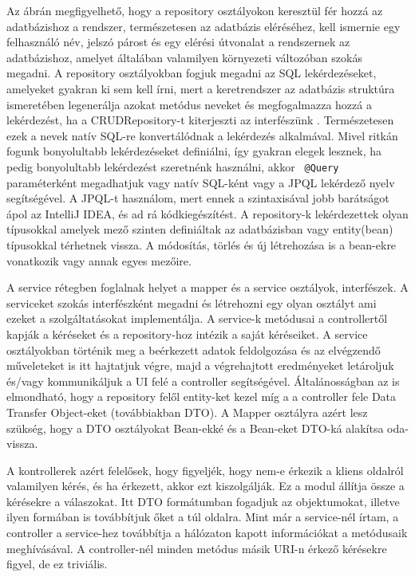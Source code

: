 Az ábrán megfigyelhető, hogy a repository osztályokon keresztül fér hozzá az adatbázishoz a rendszer, természetesen az adatbázis eléréséhez, kell ismernie egy felhasználó név, jelszó párost és egy elérési útvonalat a rendszernek az adatbázishoz, amelyet általában valamilyen környezeti változóban szokás megadni. A repository osztályokban fogjuk megadni az SQL lekérdezéseket, amelyeket gyakran ki sem kell írni, mert a keretrendszer az adatbázis struktúra ismeretében legenerálja azokat metódus neveket és megfogalmazza hozzá a lekérdezést, ha a CRUDRepository-t kiterjeszti az interfészünk . Természetesen ezek a nevek natív SQL-re konvertálódnak a lekérdezés alkalmával. Mivel ritkán fogunk bonyolultabb lekérdezéseket definiálni, így gyakran elegek lesznek, ha pedig bonyolultabb lekérdezést szeretnénk használni, akkor \texttt{ @Query } paraméterként megadhatjuk vagy natív SQL-ként vagy a JPQL lekérdező nyelv segítségével. A JPQL-t használom, mert ennek a szintaxisával jobb barátságot ápol az IntelliJ IDEA, és ad rá kódkiegészítést. A repository-k  lekérdezettek olyan típusokkal amelyek mező szinten definiáltak az adatbázisban vagy entity(bean) típusokkal térhetnek vissza. A módosítás, törlés és új létrehozása is a bean-ekre vonatkozik vagy annak egyes mezőire.

A service rétegben foglalnak helyet a mapper és a service osztályok, interfészek. A serviceket szokás interfészként megadni és létrehozni egy olyan osztályt ami ezeket a szolgáltatásokat implementálja. A service-k metódusai a controllertől kapják a kéréseket és a repository-hoz intézik a saját kéréseiket.  A service osztályokban történik meg a beérkezett adatok feldolgozása és az elvégzendő műveleteket is itt hajtatjuk végre, majd a végrehajtott eredményeket letároljuk és/vagy kommunikáljuk a UI felé a controller segítségével. Általánosságban az is elmondható, hogy a repository felől entity-ket kezel míg a a controller fele Data Transfer Object-eket (továbbiakban DTO). A Mapper osztályra azért lesz szükség, hogy a DTO osztályokat Bean-ekké és a Bean-eket DTO-ká alakítsa oda-vissza.

A kontrollerek azért felelősek, hogy figyeljék, hogy nem-e érkezik a kliens oldalról valamilyen kérés, és ha érkezett, akkor ezt kiszolgálják. Ez a modul állítja össze a kérésekre a válaszokat. Itt DTO formátumban fogadjuk az objektumokat, illetve ilyen formában is továbbítjuk őket a túl oldalra. Mint már a service-nél írtam, a controller a service-hez továbbítja a hálózaton kapott információkat a metódusaik meghívásával. A controller-nél minden metódus másik URI-n érkező kérésekre figyel, de ez triviális.

